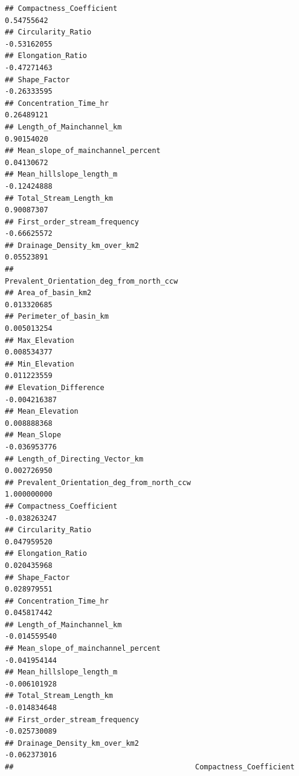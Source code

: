 \documentclass[11pt,]{article}
\begin{document}
\begin{verbatim}
## Compactness_Coefficient                                     0.54755642
## Circularity_Ratio                                          -0.53162055
## Elongation_Ratio                                           -0.47271463
## Shape_Factor                                               -0.26333595
## Concentration_Time_hr                                       0.26489121
## Length_of_Mainchannel_km                                    0.90154020
## Mean_slope_of_mainchannel_percent                           0.04130672
## Mean_hillslope_length_m                                    -0.12424888
## Total_Stream_Length_km                                      0.90087307
## First_order_stream_frequency                               -0.66625572
## Drainage_Density_km_over_km2                                0.05523891
##                                          Prevalent_Orientation_deg_from_north_ccw
## Area_of_basin_km2                                                     0.013320685
## Perimeter_of_basin_km                                                 0.005013254
## Max_Elevation                                                         0.008534377
## Min_Elevation                                                         0.011223559
## Elevation_Difference                                                 -0.004216387
## Mean_Elevation                                                        0.008888368
## Mean_Slope                                                           -0.036953776
## Length_of_Directing_Vector_km                                         0.002726950
## Prevalent_Orientation_deg_from_north_ccw                              1.000000000
## Compactness_Coefficient                                              -0.038263247
## Circularity_Ratio                                                     0.047959520
## Elongation_Ratio                                                      0.020435968
## Shape_Factor                                                          0.028979551
## Concentration_Time_hr                                                 0.045817442
## Length_of_Mainchannel_km                                             -0.014559540
## Mean_slope_of_mainchannel_percent                                    -0.041954144
## Mean_hillslope_length_m                                              -0.006101928
## Total_Stream_Length_km                                               -0.014834648
## First_order_stream_frequency                                         -0.025730089
## Drainage_Density_km_over_km2                                         -0.062373016
##                                          Compactness_Coefficient

\end{verbatim}
\end{document}
